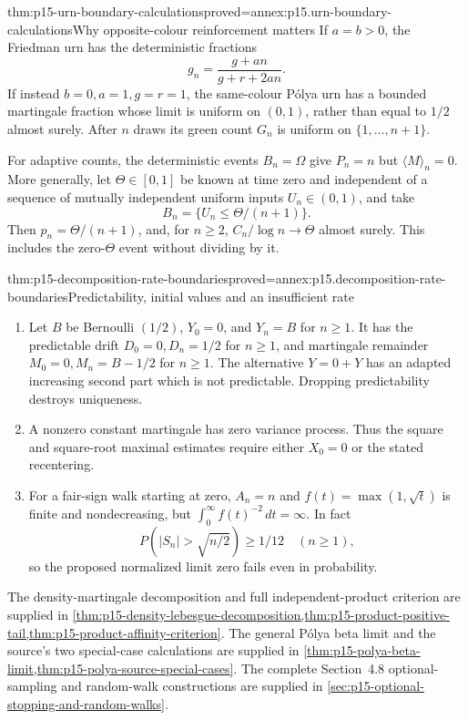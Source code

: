 \begin{hbtheorem}{thm:p15-urn-boundary-calculations}{proved=annex:p15.urn-boundary-calculations}{Why opposite-colour reinforcement matters}
If \(a=b>0\), the Friedman urn has the deterministic fractions
\[
                                g_n=\frac{g+an}{g+r+2an}.
\]
If instead \(b=0,a=1,g=r=1\), the same-colour P\'olya urn has
a bounded martingale fraction whose limit is uniform on \((0,1)\),
rather than equal to \(1/2\) almost surely.
After \(n\) draws its green count \(G_n\) is uniform on
\(\{1,\ldots,n+1\}\).

For adaptive counts, the deterministic events \(B_n=\Omega\)
give \(P_n=n\) but \(\langle M\rangle_n=0\).
More generally, let \(\Theta\in[0,1]\) be known at time zero and
independent of a sequence of mutually independent uniform inputs
\(U_n\in(0,1)\), and take
\[
                              B_n=\{U_n\leq\Theta/(n+1)\}.
\]
Then \(p_n=\Theta/(n+1)\), and, for \(n\geq2\),
\(C_n/\log n\to\Theta\) almost surely.
This includes the zero-\(\Theta\) event without dividing by it.
\end{hbtheorem}

\begin{hbtheorem}{thm:p15-decomposition-rate-boundaries}{proved=annex:p15.decomposition-rate-boundaries}{Predictability, initial values and an insufficient rate}
\begin{enumerate}
\item Let \(B\) be Bernoulli \((1/2)\), \(Y_0=0\), and \(Y_n=B\)
      for \(n\geq1\). It has the predictable drift
      \(D_0=0,D_n=1/2\) for \(n\geq1\), and martingale remainder
      \(M_0=0,M_n=B-1/2\) for \(n\geq1\).
      The alternative \(Y=0+Y\) has an adapted increasing second
      part which is not predictable. Dropping predictability
      destroys uniqueness.
\item A nonzero constant martingale has zero variance process.
      Thus the square and square-root maximal estimates require
      either \(X_0=0\) or the stated recentering.
\item For a fair-sign walk starting at zero, \(A_n=n\) and
      \(f(t)=\max(1,\sqrt t)\) is finite and nondecreasing, but
      \(\int_0^\infty f(t)^{-2}\,dt=\infty\).
      In fact
      \[
                            P(|S_n|>\sqrt{n/2})\geq1/12
                                                \quad(n\geq1),
      \]
      so the proposed normalized limit zero fails even in probability.
\end{enumerate}
\end{hbtheorem}

The density-martingale decomposition and full independent-product
criterion are supplied in \cref{thm:p15-density-lebesgue-decomposition,thm:p15-product-positive-tail,thm:p15-product-affinity-criterion}.
The general P\'olya beta limit and the source's two special-case
calculations are supplied in \cref{thm:p15-polya-beta-limit,thm:p15-polya-source-special-cases}.
The complete Section~4.8 optional-sampling and random-walk constructions
are supplied in \cref{sec:p15-optional-stopping-and-random-walks}.
